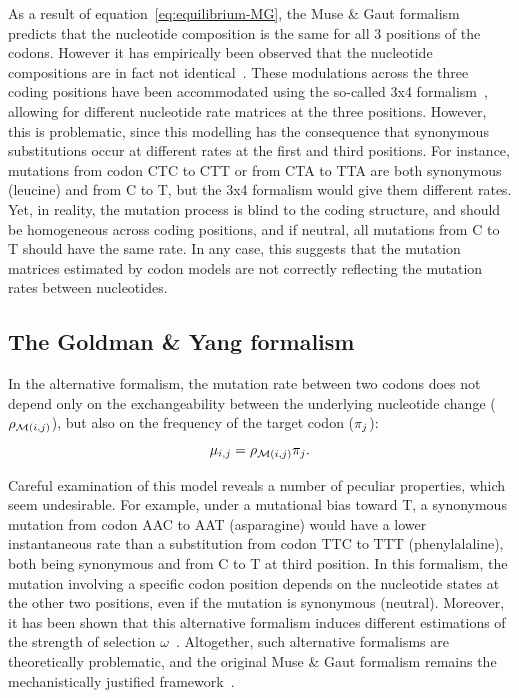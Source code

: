 As a result of equation~\ref{eq:equilibrium-MG}, the Muse \& Gaut formalism predicts that the nucleotide composition is the same for all $3$ positions of the \glspl{codon}.
However it has empirically been observed that the nucleotide compositions are in fact not identical~\citep{Singer2000}.
These modulations across the three coding positions have been accommodated using the so-called 3x4 formalism~\citep{Muse1994, Goldman1994}, allowing for different nucleotide rate matrices at the three positions.
However, this is problematic, since this modelling has the consequence that \gls{synonymous} \glspl{substitution} occur at different rates at the first and third positions.
For instance, mutations from \gls{codon} CTC to CTT or from CTA to TTA are both \gls{synonymous} (leucine) and from C to T, but the 3x4 formalism would give them different rates.
Yet, in reality, the mutation process is blind to the coding structure, and should be homogeneous across coding positions, and if \gls{neutral}, all mutations from C to T should have the same rate.
In any case, this suggests that the mutation matrices estimated by \gls{codon} models are not correctly reflecting the mutation rates between nucleotides.

\subsection{The Goldman \& Yang formalism}
\label{subsec:GY-formalism}

In the alternative \citet{Goldman1994} formalism, the mutation rate between two \glspl{codon} does not depend only on the exchangeability between the underlying nucleotide change ($\rho_{\mathcal{M}({i}, {j})}$), but also on the frequency of the target \gls{codon} ($\pi_{{j}}$):
\begin{equation}
    \mu_{{i}, {j}} = \rho_{\mathcal{M}({i}, {j})} \pi_{{j}}.
\end{equation}

Careful examination of this model reveals a number of peculiar properties, which seem undesirable.
For example, under a mutational bias toward T, a \gls{synonymous} mutation from \gls{codon} AAC to AAT (asparagine) would have a lower instantaneous rate than a \gls{substitution} from \gls{codon} TTC to TTT (phenylalaline), both being \gls{synonymous} and from C to T at third position.
In this formalism, the mutation involving a specific \gls{codon} position depends on the nucleotide states at the other two positions, even if the mutation is \gls{synonymous} (\gls{neutral}).
Moreover, it has been shown that this alternative formalism induces different estimations of the strength of selection $\omega$~\citep{Pond2005a,Yap2010, Spielman2015}.
Altogether, such alternative formalisms are theoretically problematic, and the original Muse \& Gaut formalism remains the mechanistically justified framework~\citep{Rodrigue2008a}.

